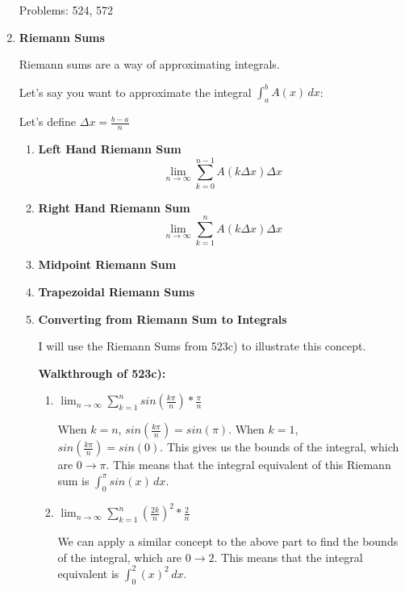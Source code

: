 \documentclass[11pt,twoside]{article}
\begin{document}
\begin{enumerate}
Problems: 524, 572

\item \textbf{Riemann Sums}

Riemann sums are a way of approximating integrals. 

Let's say you want to approximate the integral $\int_{a}^{b} A(x) \,dx$: 

Let's define $\Delta x = \frac{b - a}{n}$

    \begin{enumerate}
    \item \textbf{Left Hand Riemann Sum}
$$
\lim_{n\to\infty} \sum_{k=0} ^{n-1} A(k\Delta x)\Delta x 
$$
    \item \textbf{Right Hand Riemann Sum}
$$
\lim_{n\to\infty} \sum_{k=1} ^{n} A(k\Delta x)\Delta x 
$$

    \item \textbf{Midpoint Riemann Sum} 
    \item \textbf{Trapezoidal Riemann Sums}
    \item \textbf{Converting from Riemann Sum to Integrals}
    
    I will use the Riemann Sums from 523c) to illustrate this concept.
    
    \textbf{Walkthrough of 523c):}
    
    \begin{enumerate}
        
        \item 
        $\lim_{n \to\infty} \sum_{k=1} ^{n} sin(\frac{k \pi}{n}) * \frac{\pi}{n}$
        
        When $k = n$, $sin(\frac{k \pi}{n}) = sin(\pi).$ When $k = 1$, $sin(\frac{k \pi}{n}) = sin(0).$ This gives us the bounds of the integral, which are $0\rightarrow\pi.$ This means that the integral equivalent of this Riemann sum is $\int_{0}^{\pi} sin(x) \,dx$.
        
        \item 
        $\lim_{n \to\infty} \sum_{k=1} ^{n} (\frac{2k}{n})^2 * \frac{2}{n}$
        
        We can apply a similar concept to the above part to find the bounds of the integral, which are $0\rightarrow2$. This means that the integral equivalent is $\int_{0}^{2} (x)^2 \,dx$.
    
    \end{enumerate}


  \end{enumerate}


\end{enumerate}
\end{document}
